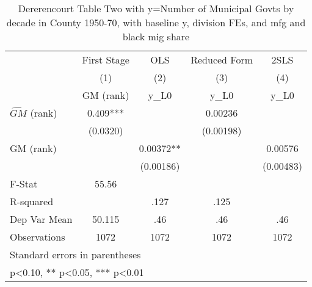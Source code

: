 \begin{table}[htbp]\centering
\def\sym#1{\ifmmode^{#1}\else\(^{#1}\)\fi}
\caption{Dererencourt Table Two with y=Number of Municipal Govts by decade in County 1950-70, with baseline y, division FEs, and mfg and black mig share}
\begin{tabular}{l*{4}{c}}
\toprule
                    & First Stage   &         OLS   &Reduced Form   &        2SLS   \\
                    &\multicolumn{1}{c}{(1)}&\multicolumn{1}{c}{(2)}&\multicolumn{1}{c}{(3)}&\multicolumn{1}{c}{(4)}\\
                    &\multicolumn{1}{c}{GM  (rank)}&\multicolumn{1}{c}{y\_L0}&\multicolumn{1}{c}{y\_L0}&\multicolumn{1}{c}{y\_L0}\\
\midrule
$\hat{GM}$ (rank)   &       0.409***&               &     0.00236   &               \\
                    &    (0.0320)   &               &   (0.00198)   &               \\
\addlinespace
GM  (rank)          &               &     0.00372** &               &     0.00576   \\
                    &               &   (0.00186)   &               &   (0.00483)   \\
\midrule
F-Stat              &       55.56   &               &               &               \\
R-squared           &               &        .127   &        .125   &               \\
Dep Var Mean        &      50.115   &         .46   &         .46   &         .46   \\
Observations        &        1072   &        1072   &        1072   &        1072   \\
\bottomrule
\multicolumn{5}{l}{\footnotesize Standard errors in parentheses}\\
\multicolumn{5}{l}{\footnotesize * p<0.10, ** p<0.05, *** p<0.01}\\
\end{tabular}
\end{table}
